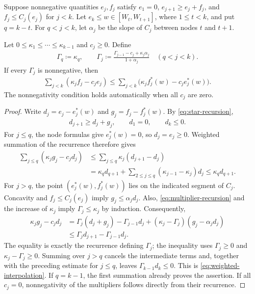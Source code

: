 \begin{lemma}\label{lem:interpolation}
Suppose nonnegative quantities $e_j,f_j$ satisfy $e_1=0$, $e_{j+1}\ge e_j+f_j$, and $f_j\le C_j(e_j)$ for $j<k$. Let $e_k\le w\in[W_t,W_{t+1}]$, where $1\le t<k$, and put $q=k-t$. For $q<j<k$, let $\alpha_j$ be the slope of $C_j$ between nodes $t$ and $t+1$.

Let $0\le\kappa_1\le\cdots\le\kappa_{k-1}$ and $c_j\ge0$. Define
\begin{align}\label{eq:multiplier-recursion}
 \Gamma_q\coloneqq\kappa_q,
 \qquad \Gamma_j\coloneqq\frac{\Gamma_{j-1}-c_j+\kappa_j\alpha_j}{1+\alpha_j}
 \quad(q<j<k).
\end{align}
If every $\Gamma_j$ is nonnegative, then
\begin{align}\label{eq:weighted-interpolation}
 \sum_{j<k}(\kappa_jf_j-c_je_j)
 \le\sum_{j<k}\bigl(\kappa_jf_j^*(w)-c_je_j^*(w)\bigr).
\end{align}
The nonnegativity condition holds automatically when all $c_j$ are zero.
\end{lemma}

\begin{proof}
Write $d_j=e_j-e_j^*(w)$ and $g_j=f_j-f_j^*(w)$. By \cref{eq:star-recursion},
\begin{align*}
 d_{j+1}\ge d_j+g_j,
 \qquad d_1=0,
 \qquad d_k\le0.
\end{align*}
For $j\le q$, the node formulas give $e_j^*(w)=0$, so $d_j=e_j\ge0$. Weighted summation of the recurrence therefore gives
\begin{align*}
 \sum_{j\le q}(\kappa_jg_j-c_jd_j)
 &\le\sum_{j\le q}\kappa_j(d_{j+1}-d_j)\\
 &=\kappa_qd_{q+1}+\sum_{2\le j\le q}(\kappa_{j-1}-\kappa_j)d_j
 \le\kappa_qd_{q+1}.
\end{align*}
For $j>q$, the point $(e_j^*(w),f_j^*(w))$ lies on the indicated segment of $C_j$. Concavity and $f_j\le C_j(e_j)$ imply $g_j\le\alpha_jd_j$. Also, \cref{eq:multiplier-recursion} and the increase of $\kappa_j$ imply $\Gamma_j\le\kappa_j$ by induction. Consequently,
\begin{align*}
 \kappa_jg_j-c_jd_j
 &=\Gamma_j(d_j+g_j)-\Gamma_{j-1}d_j
   +(\kappa_j-\Gamma_j)(g_j-\alpha_jd_j)\\
 &\le\Gamma_jd_{j+1}-\Gamma_{j-1}d_j.
\end{align*}
The equality is exactly the recurrence defining $\Gamma_j$; the inequality uses $\Gamma_j\ge0$ and $\kappa_j-\Gamma_j\ge0$. Summing over $j>q$ cancels the intermediate terms and, together with the preceding estimate for $j\le q$, leaves $\Gamma_{k-1}d_k\le0$. This is \cref{eq:weighted-interpolation}. If $q=k-1$, the first summation already proves the assertion. If all $c_j=0$, nonnegativity of the multipliers follows directly from their recurrence.
\end{proof}

